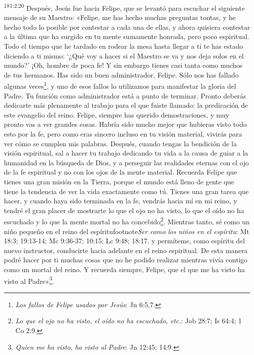 \par
\textsuperscript{181:2.20} Después, Jesús fue hacia Felipe, que se levantó para escuchar el siguiente mensaje de su Maestro: «Felipe, me has hecho muchas preguntas tontas, y he hecho todo lo posible por contestar a cada una de ellas, y ahora quisiera contestar a la última que ha surgido en tu mente sumamente honrada, pero poco espiritual. Todo el tiempo que he tardado en rodear la mesa hasta llegar a ti te has estado diciendo a ti mismo: `¿Qué voy a hacer si el Maestro se va y nos deja solos en el mundo?' ¡Oh, hombre de poca fe! Y sin embargo tienes casi tanta como muchos de tus hermanos. Has sido un buen administrador, Felipe. Sólo nos has fallado algunas veces\footnote{\textit{Los fallos de Felipe usados por Jesús}: Jn 6:5,7.}, y uno de esos fallos lo utilizamos para manifestar la gloria del Padre. Tu función como administrador está a punto de terminar. Pronto deberás dedicarte más plenamente al trabajo para el que fuiste llamado: la predicación de este evangelio del reino. Felipe, siempre has querido demostraciones, y muy pronto vas a ver grandes cosas. Habría sido mucho mejor que hubieras visto todo esto por la fe, pero como eras sincero incluso en tu visión material, vivirás para ver cómo se cumplen mis palabras. Después, cuando tengas la bendición de la visión espiritual, sal a hacer tu trabajo dedicando tu vida a la causa de guiar a la humanidad en la búsqueda de Dios, y a perseguir las realidades eternas con el ojo de la fe espiritual y no con los ojos de la mente material. Recuerda Felipe que tienes una gran misión en la Tierra, porque el mundo está lleno de gente que tiene la tendencia de ver la vida exactamente como tú. Tienes una gran tarea que hacer, y cuando haya sido terminada en la fe, vendrás hacia mí en mi reino, y tendré el gran placer de mostrarte lo que el ojo no ha visto, lo que el oído no ha escuchado y lo que la mente mortal no ha concebido\footnote{\textit{Lo que el ojo no ha visto, el oído no ha escuchado, etc.}: Job 28:7; Is 64:4; 1 Co 2:9.}. Mientras tanto, sé como un niño pequeño en el reino del espíritufootnote{\textit{Ser como los niños en el espíritu}: Mt 18:3; 19:13-14; Mc 9:36-37; 10:15; Lc 9:48; 18:17.} y permíteme, como espíritu del nuevo instructor, conducirte hacia adelante en el reino espiritual. De esta manera podré hacer por ti muchas cosas que no he podido realizar mientras vivía contigo como un mortal del reino. Y recuerda siempre, Felipe, que el que me ha visto ha visto al Padre»\footnote{\textit{Quien me ha visto, ha visto al Padre}: Jn 12:45; 14:9.}.

